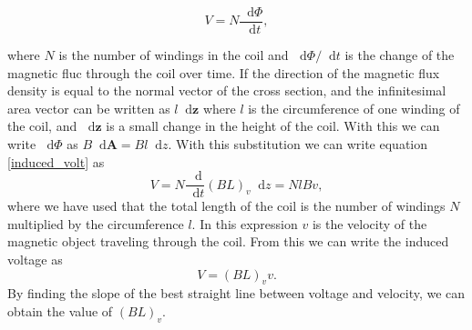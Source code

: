 \documentclass[english,a4paper,12pt,reprint]{revtex4-1}
\newcommand*\diff{\mathop{}\!\mathrm{d}}
\begin{document}
\begin{equation}
    V = N\frac{\diff\Phi}{\diff t}, \label{induced_volt}
\end{equation}

where $N$ is the number of windings in the coil and $\diff\Phi/\diff t$ is the change of the magnetic fluc through the coil over time. If the direction of the magnetic flux density is equal to the normal vector of the cross section, and the infinitesimal area vector can be written as $l\diff \bm{z}$ where $l$ is the circumference of one winding of the coil, and $\diff \bm{z}$ is a small change in the height of the coil. With this we can write $\diff \Phi$ as $B\diff \bm{A} = Bl\diff z$. With this substitution we can write equation \eqref{induced_volt} as
\begin{equation}
    V = N\frac{\diff}{\diff t}\left(BL\right)_v\diff z = NlBv,
\end{equation}where we have used that the total length of the coil is the number of windings $N$ multiplied by the circumference $l$. In this expression $v$ is the velocity of the magnetic object traveling through the coil. From this we can write the induced voltage as
\begin{equation}
    V = \left(BL\right)_vv. \label{voltage}
\end{equation}
By finding the slope of the best straight line between voltage and velocity, we can obtain the value of $\left(BL\right)_v$.
\end{document}
